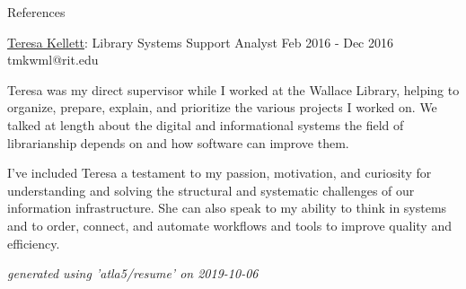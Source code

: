 \documentclass{resume} %
\begin{document}
\begin{rSection}{References}
\begin{rSubsection}{\underline{Teresa Kellett}: Library Systems Support Analyst }{ Feb 2016 - Dec 2016 }{tmkwml@rit.edu}
      \item Teresa was my direct supervisor while I worked at the Wallace Library, helping to organize, prepare, explain, and prioritize the various projects I worked on. We talked at length about the digital and informational systems the field of librarianship depends on and how software can improve them. \newline

      \item I've included Teresa a testament to my passion, motivation, and curiosity for understanding and solving the structural and systematic challenges of our information infrastructure. She can also speak to my ability to think in systems and to order, connect, and automate workflows and tools to improve quality and efficiency. \newline

    \end{rSubsection}

  \end{rSection}

  \begin{flushright}
    \em{generated using 'atla5/resume' on 2019-10-06}
  \end{flushright}
\end{document}
